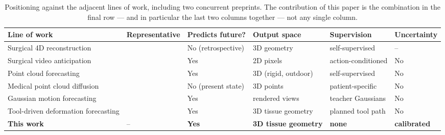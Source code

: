 \documentclass[conference]{IEEEtran}
\begin{document}
\begin{table}[t]
\centering
\caption{Positioning against the adjacent lines of work, including two concurrent
preprints. The contribution of this paper is the combination in the final row --- and in
particular the last two columns together --- not any single column.}
\label{tab:positioning}
\begin{tabular}{llllll}
\toprule
Line of work & Representative & Predicts future? & Output space & Supervision & Uncertainty \\
\midrule
Surgical 4D reconstruction & \cite{wang2022endonerf,ruan2023lerplane,liu2024endogaussian,yang2024deform3dgs}
  & No (retrospective) & 3D geometry & self-supervised & -- \\
Surgical video anticipation & \cite{gao2021futureframe,pan2026surgvista}
  & Yes & 2D pixels & action-conditioned & No \\
Point cloud forecasting & \cite{fan2019pointrnn,lu2021monet,luo2023pcpnet}
  & Yes & 3D (rigid, outdoor) & self-supervised & No \\
Medical point cloud diffusion & \cite{xie2025liverdiffusion}
  & No (present state) & 3D points & patient-specific & No \\
Gaussian motion forecasting & \cite{surggmf2026}
  & Yes & rendered views & teacher Gaussians & No \\
Tool-driven deformation forecasting & \cite{obsref2026}
  & Yes & 3D tissue geometry & planned tool path & No \\
\midrule
\textbf{This work} & -- & \textbf{Yes} & \textbf{3D tissue geometry}
  & \textbf{none} & \textbf{calibrated} \\
\bottomrule
\end{tabular}
\end{table}

\end{document}
